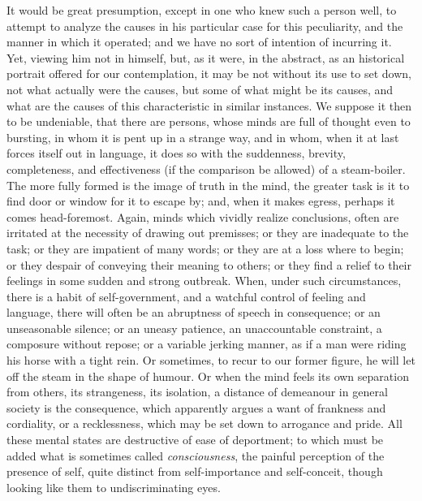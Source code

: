 It would be great presumption, except in one who
knew such a person well, to attempt to analyze the causes in his
particular case for this peculiarity, and the manner in which it
operated; and we have no sort of intention of incurring it. Yet,
viewing him not in himself, but, as it were, in the abstract, as an
historical portrait offered for our contemplation, it may be not
without its use to set down, not what actually were the causes, but
some of what might be its causes, and what are the causes of this
characteristic in similar instances. We suppose it then to be
undeniable, that there are persons, whose minds are full of thought
even to bursting, in whom it is pent up in a strange way, and in whom,
when it at last forces itself out in language, it does so with the
suddenness, brevity, completeness, and effectiveness (if the
comparison be allowed) of a steam-boiler. The more fully formed is the
image of truth in the mind, the greater task is it to find door or
window for it to escape by; and, when it makes egress, perhaps it
comes head-foremost. Again, minds which vividly realize conclusions,
often are irritated at the necessity of drawing out premisses; or they
are inadequate to the task; or they are impatient of many words; or
they are at a loss where to begin; or they despair of conveying their
meaning to others; or they find a relief to their feelings in some
sudden and strong outbreak. When, under such circumstances, there is a
habit of self-government, and a watchful control of feeling and
language, there will often be an abruptness of speech in consequence;
or an unseasonable silence; or an uneasy patience, an
unaccountable constraint, a composure without repose; or a variable
jerking manner, as if a man were riding his horse with a tight rein.
Or sometimes, to recur to our former figure, he will let off the steam
in the shape of humour. Or when the mind feels its own separation from
others, its strangeness, its isolation, a distance of demeanour in
general society is the consequence, which apparently argues a want of
frankness and cordiality, or a recklessness, which may be set down to
arrogance and pride. All these mental states are destructive of ease
of deportment; to which must be added what is sometimes called \emph{consciousness},
the painful perception of the presence of self, quite distinct from
self-importance and self-conceit, though looking like them to
undiscriminating eyes.

